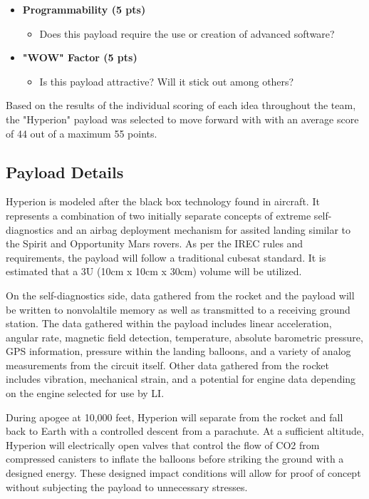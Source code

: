 \documentclass[conference]{IEEEtran} %
\begin{document}
\begin{itemize}
  \item \textbf{Programmability (5 pts)}
  \begin{itemize}
    \item Does this payload require the use or creation of advanced software?
  \end{itemize}

  \item \textbf{"WOW" Factor (5 pts)}
  \begin{itemize}
    \item Is this payload attractive? Will it stick out among others?
  \end{itemize}
\end{itemize}

Based on the results of the individual scoring of each idea throughout the team, the "Hyperion" payload was selected to move forward with
with an average score of 44 out of a maximum 55 points.

\subsection{Payload Details}
\label{subsec:Payload Details}
Hyperion is modeled after the black box technology found in aircraft. It represents a combination of two initially separate concepts of extreme self-diagnostics
and an airbag deployment mechanism for assited landing similar to the Spirit and Opportunity Mars rovers. As per the IREC rules and requirements, the payload will
follow a traditional cubesat standard. It is estimated that a 3U (10cm x 10cm x 30cm) volume will be utilized.

On the self-diagnostics side, data gathered from the rocket and the payload will be written to nonvolaltile
memory as well as transmitted to a receiving ground station. The data gathered within the payload includes linear acceleration, angular rate, magnetic field detection,
temperature, absolute barometric pressure, GPS information, pressure within the landing balloons, and a variety of analog measurements from the circuit itself. Other data
gathered from the rocket includes vibration, mechanical strain, and a potential for engine data depending on the engine selected for use by LI.

During apogee at 10,000 feet, Hyperion will separate from the rocket and fall back to Earth with a controlled descent from a parachute. At a sufficient altitude, Hyperion will
electrically open valves that control the flow of CO2 from compressed canisters to inflate the balloons before striking the ground with a designed energy. These designed impact
conditions will allow for proof of concept without subjecting the payload to unnecessary stresses.
\end{document}
